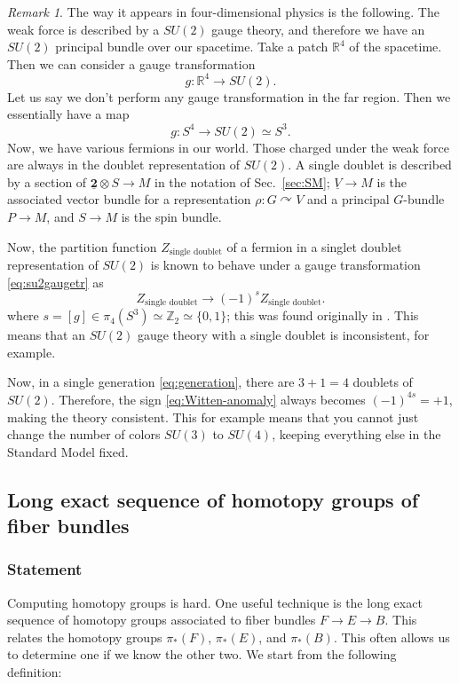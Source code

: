 \documentclass[12pt]{article}
\numberwithin{equation}{section}
\theoremstyle{remark}
\newtheorem{remark}[definition]{Remark}
\def\bR{\mathbb{R}}
\def\bZ{\mathbb{Z}}
\begin{document}
\begin{remark}
The way it appears in four-dimensional physics is the following.
The weak force is described by a $SU(2)$ gauge theory,
and therefore we have an $SU(2)$ principal bundle over our spacetime.
Take a patch $\bR^4$ of the spacetime.
Then we can consider a gauge transformation \begin{equation}
  g:\bR^4\to SU(2).
\end{equation}
Let us say we don't perform any gauge transformation in the far region.
Then we essentially have a map \begin{equation}
g: S^4\to SU(2) \simeq S^3. \label{eq:su2gaugetr}
\end{equation}
Now, we have various fermions in our world.
Those charged under the weak force 
are always in the doublet representation of $SU(2)$.
A single doublet is described by a section of $\underline{\mathbf{2}}\otimes S\to M$ 
in the notation of Sec.~\ref{sec:SM};
$\underline{V}\to M$ 
is the associated vector bundle
for a representation $\rho: G \curvearrowright V$
and a principal $G$-bundle $P\to M$,
and $S\to M$ is the spin bundle.

Now, the partition function $Z_\text{single doublet}$ of a fermion in a singlet doublet representation 
of $SU(2)$ 
is known to behave under 
a gauge transformation \eqref{eq:su2gaugetr} as \begin{equation}
  Z_\text{single doublet} \to (-1)^s Z_\text{single doublet}.\label{eq:Witten-anomaly}
\end{equation}
where $s=[g] \in \pi_4(S^3) \simeq \bZ_2 \simeq \{0,1\}$;
this was found originally in \cite{Witten:1982fp}.
This means that an $SU(2)$ gauge theory with a single doublet is inconsistent, for example.

Now, in a single generation \eqref{eq:generation},
there are $3+1=4$ doublets of $SU(2)$.
Therefore, the sign \eqref{eq:Witten-anomaly} always becomes $(-1)^{4s}=+1$,
making the theory consistent.
This for example means that you cannot just change the number of colors $SU(3)$ to $SU(4)$, 
keeping everything else in the Standard Model fixed.
\end{remark}


\subsection{Long exact sequence of homotopy groups of fiber bundles}
\subsubsection{Statement}
Computing homotopy groups is hard. 
One useful technique is the long exact sequence of homotopy groups
associated to fiber bundles $F\to E\to B$.
This relates the homotopy groups  $\pi_*(F)$, $\pi_*(E)$, and $\pi_*(B)$.
This often allows us to determine one if we know the other two.
We start from the following definition:
\end{document}
